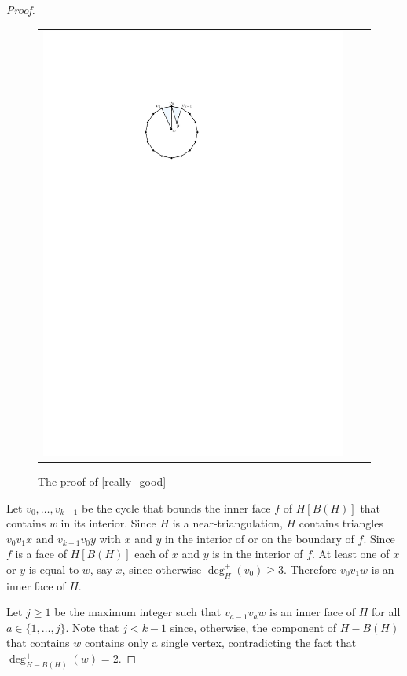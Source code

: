 \documentclass[12pt]{article}
\theoremstyle{definition}
\begin{document}
\begin{proof}
\begin{figure}
\begin{tabular}{ccc}
      \includegraphics[page=3]{figs/really_good}
    \end{tabular}
    \caption{The proof of \cref{really_good}}
    \label{really_good_fig}
  \end{figure}

  Let $v_0,\ldots,v_{k-1}$ be the cycle that bounds the inner face $f$ of $H[B(H)]$ that contains $w$ in its interior.  Since $H$ is a near-triangulation, $H$ contains triangles $v_0v_1x$ and $v_{k-1}v_0 y$ with $x$ and $y$ in the interior of or on the boundary of $f$.  Since $f$ is a face of $H[B(H)]$ each of $x$ and $y$ is in the interior of $f$.  At least one of $x$ or $y$ is equal to $w$, say $x$, since otherwise $\deg^+_H(v_0)\ge 3$.  Therefore $v_0v_1 w$ is an inner face of $H$.

  Let $j\ge 1$ be the maximum integer such that $v_{a-1}v_{a}w$ is an inner face of $H$ for all $a\in\{1,\ldots,j\}$.  Note that $j<k-1$ since, otherwise, the component of $H-B(H)$ that contains $w$ contains only a single vertex, contradicting the fact that $\deg^+_{H-B(H)}(w)=2$.


\end{proof}
\end{document}

